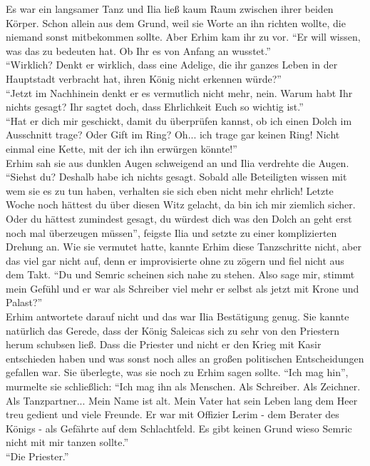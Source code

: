 Es war ein langsamer Tanz und Ilia ließ kaum Raum zwischen ihrer beiden Körper. Schon allein aus 
dem Grund, weil sie Worte an ihn richten wollte, die niemand sonst mitbekommen sollte. Aber Erhim 
kam ihr zu vor. ``Er will wissen, was das zu bedeuten hat. Ob Ihr es von Anfang an wusstet.''\\
``Wirklich? Denkt er wirklich, dass eine Adelige, die ihr ganzes Leben in der Hauptstadt verbracht 
hat, ihren König nicht erkennen würde?''\\
``Jetzt im Nachhinein denkt er es vermutlich nicht mehr, nein. Warum habt Ihr nichts gesagt? Ihr 
sagtet doch, dass Ehrlichkeit Euch so wichtig ist.''\\
``Hat er dich mir geschickt, damit du überprüfen kannst, ob ich einen Dolch im Ausschnitt trage? 
Oder Gift im Ring? Oh... ich trage gar keinen Ring! Nicht einmal eine Kette, mit der ich ihn 
erwürgen könnte!''\\
Erhim sah sie aus dunklen Augen schweigend an und Ilia verdrehte die Augen. ``Siehst du? Deshalb 
habe ich nichts gesagt. Sobald alle Beteiligten wissen mit wem sie es zu tun haben, verhalten sie 
sich eben nicht mehr ehrlich! Letzte Woche noch hättest du über diesen Witz gelacht, da bin ich mir 
ziemlich sicher. Oder du hättest zumindest gesagt, du würdest dich was den Dolch an geht erst noch 
mal überzeugen müssen'', feigste Ilia und setzte zu einer komplizierten Drehung an. Wie sie 
vermutet hatte, kannte Erhim diese Tanzschritte nicht, aber das viel gar nicht auf, denn er 
improvisierte ohne zu zögern und fiel nicht aus dem Takt. ``Du und Semric scheinen sich nahe zu 
stehen. Also sage mir, stimmt mein Gefühl und er war als Schreiber viel mehr er selbst als 
jetzt mit Krone und Palast?''\\
Erhim antwortete darauf nicht und das war Ilia Bestätigung genug. Sie kannte natürlich das Gerede, 
dass der König Saleicas sich zu sehr von den Priestern herum schubsen ließ. Dass die Priester und 
nicht er den Krieg mit Kasir entschieden haben und was sonst noch alles an großen politischen 
Entscheidungen gefallen war. Sie überlegte, was sie noch zu Erhim sagen sollte. ``Ich mag hin'', 
murmelte sie schließlich: ``Ich mag ihn als Menschen. Als Schreiber. Als Zeichner. Als 
Tanzpartner... Mein Name ist alt. Mein Vater hat sein Leben lang dem Heer treu 
gedient und viele Freunde. Er war mit Offizier Lerim - dem Berater des Königs - als Gefährte auf 
dem Schlachtfeld. Es gibt keinen Grund wieso Semric nicht mit mir tanzen sollte.''\\
``Die Priester.''\\
